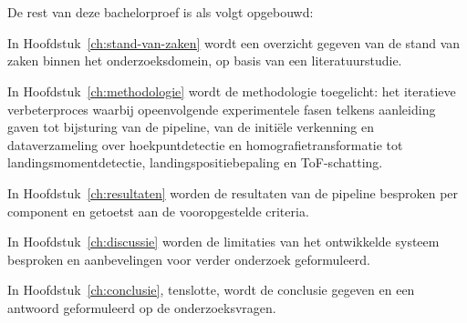 \section{}%
\label{sec:opzet-bachelorproef}

De rest van deze bachelorproef is als volgt opgebouwd:

In Hoofdstuk~\ref{ch:stand-van-zaken} wordt een overzicht gegeven van de stand van zaken binnen het onderzoeksdomein, op basis van een literatuurstudie.

In Hoofdstuk~\ref{ch:methodologie} wordt de methodologie toegelicht: het iteratieve verbeterproces waarbij opeenvolgende experimentele fasen telkens aanleiding gaven tot bijsturing van de pipeline, van de initi{\"e}le verkenning en dataverzameling over hoekpuntdetectie en homografietransformatie tot landingsmomentdetectie, landingspositiebepaling en ToF-schatting.

In Hoofdstuk~\ref{ch:resultaten} worden de resultaten van de pipeline besproken per component en getoetst aan de vooropgestelde criteria.

In Hoofdstuk~\ref{ch:discussie} worden de limitaties van het ontwikkelde systeem besproken en aanbevelingen voor verder onderzoek geformuleerd.

In Hoofdstuk~\ref{ch:conclusie}, tenslotte, wordt de conclusie gegeven en een antwoord geformuleerd op de onderzoeksvragen.
